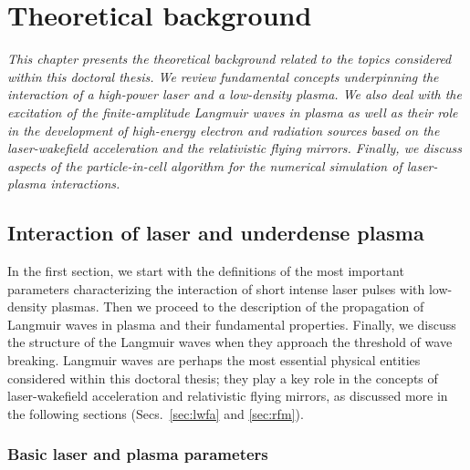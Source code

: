 \documentclass[10pt, a4paper, twoside, openright]{report}
\begin{document}
\chapter{Theoretical background\label{chap:theoretical_background}}

\noindent \textsl{This chapter presents the theoretical background related to the topics considered within this doctoral thesis. We review fundamental concepts underpinning the interaction of a high-power laser and a low-density plasma. We also deal with the excitation of the finite-amplitude Langmuir waves in plasma as well as their role in the development of high-energy electron and radiation sources based on the laser-wakefield acceleration and the relativistic flying mirrors. Finally, we discuss aspects of the particle-in-cell algorithm for the numerical simulation of laser-plasma interactions.}

\section{Interaction of laser and underdense plasma}

In the first section, we start with the definitions of the most important parameters characterizing the interaction of short intense laser pulses with low-density plasmas. Then we proceed to the description of the propagation of Langmuir waves in plasma and their fundamental properties. Finally, we discuss the structure of the Langmuir waves when they approach the threshold of wave breaking. Langmuir waves are perhaps the most essential physical entities considered within this doctoral thesis; they play a key role in the concepts of laser-wakefield acceleration and relativistic flying mirrors, as discussed more in the following sections (Secs.~\ref{sec:lwfa} and \ref{sec:rfm}). 



\subsection{Basic laser and plasma parameters\label{sec:laser_plasma_params}}
\end{document}

